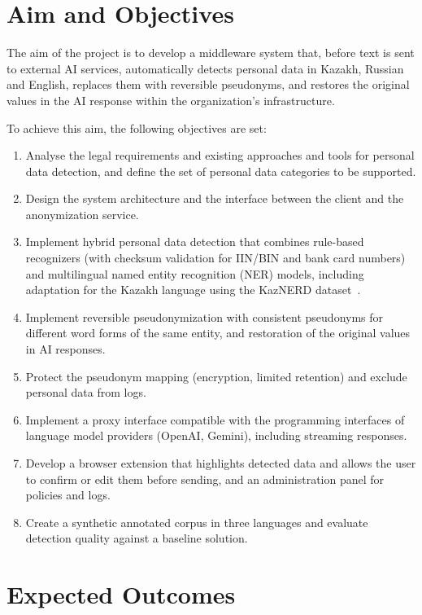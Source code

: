 \documentclass[12pt,a4paper]{article}
\begin{document}
\section{Aim and Objectives}

The aim of the project is to develop a middleware system that, before text is sent to external AI services, automatically detects personal data in Kazakh, Russian and English, replaces them with reversible pseudonyms, and restores the original values in the AI response within the organization's infrastructure.

To achieve this aim, the following objectives are set:
\begin{enumerate}
\item Analyse the legal requirements and existing approaches and tools for personal data detection, and define the set of personal data categories to be supported.
\item Design the system architecture and the interface between the client and the anonymization service.
\item Implement hybrid personal data detection that combines rule-based recognizers (with checksum validation for IIN/BIN and bank card numbers) and multilingual named entity recognition (NER) models, including adaptation for the Kazakh language using the KazNERD dataset~\cite{kaznerd}.
\item Implement reversible pseudonymization with consistent pseudonyms for different word forms of the same entity, and restoration of the original values in AI responses.
\item Protect the pseudonym mapping (encryption, limited retention) and exclude personal data from logs.
\item Implement a proxy interface compatible with the programming interfaces of language model providers (OpenAI, Gemini), including streaming responses.
\item Develop a browser extension that highlights detected data and allows the user to confirm or edit them before sending, and an administration panel for policies and logs.
\item Create a synthetic annotated corpus in three languages and evaluate detection quality against a baseline solution.
\end{enumerate}

\section{Expected Outcomes}
\end{document}
